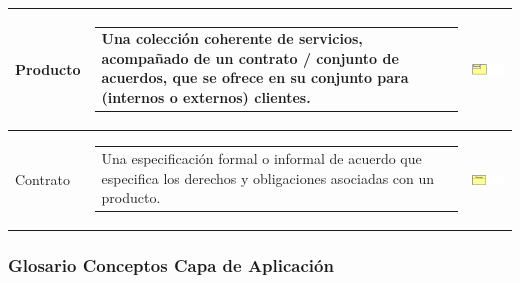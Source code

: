 \begin{longtable}[c]{|p{2.5cm}|l|c|}
	Producto				    & \begin{tabular}[c]{p{7cm}@{}l@{}}Una colección coherente de servicios, acompañado de un contrato / conjunto de acuerdos, que se ofrece en su conjunto para (internos o externos) clientes.\end{tabular} & \includegraphics[width=35mm]{arquitectura/adm_lenguaje/imgs/business/Product}          \\ \hline
	Contrato				    & \begin{tabular}[c]{p{7cm}@{}l@{}}Una especificación formal o informal de acuerdo que especifica los derechos y obligaciones asociadas con un producto.\end{tabular} & \includegraphics[width=35mm]{arquitectura/adm_lenguaje/imgs/business/Contract}          \\ \hline
\end{longtable}

\newpage

\subsubsection{Glosario Conceptos Capa de Aplicación}

